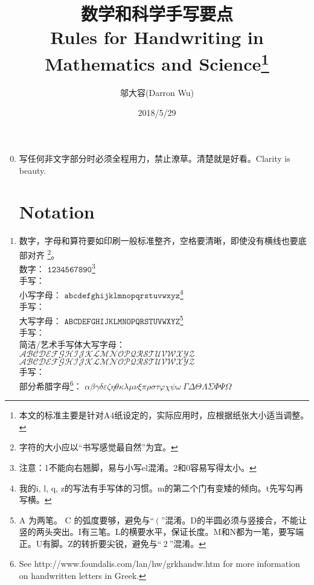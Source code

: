 \documentclass[11pt, a4paper, titlepage]{article}
\begin{document}
\title{数学和科学手写要点\\
\centering
{\Large Rules for Handwriting in Mathematics and Science\footnote{本文的标准主要是针对A4纸设定的，实际应用时，应根据纸张大小适当调整。}}}
\author{邬大容(Darron Wu)}
\date{2018/5/29}
\maketitle

\begin{enumerate}\setcounter{enumi}{-1}
\item 写任何非文字部分时必须全程用力，禁止潦草。清楚就是好看。Clarity is beauty.

\part{Notation}
\item 数字，字母和算符要如印刷一般标准整齐，空格要清晰，即使没有横线也要底部对齐    \footnote{字符的大小应以“书写感觉最自然”为宜。}。\\
    数字：
    {\fontsize{14pt}{1} $\mathtt{1234567890}$}\footnote{注意：1不能向右翘脚，易与小写el混淆。2和0容易写得太小。}\\
    手写：\\[7pt]
    小写字母：
    {\fontsize{14pt}{1} $\mathtt{abcdefghijklmnopqrstuvwxyz}$}\footnote{我的i, l, q, z的写法有手写体的习惯。m的第二个门有变矮的倾向。t先写勾再写横。}\\
    手写：\\[7pt]
    大写字母：
    {\fontsize{14pt}{1}
    $\mathtt{ABCDEFGHIJKLMNOPQRSTUVWXYZ}$}\footnote{A 为两笔。 C 的弧度要够，避免与``$\:(\:$''混淆。D的半圆必须与竖接合，不能让竖的两头突出。I有三笔。L的横要水平，保证长度。M和N都为一笔，要写端正。U有脚。Z的转折要尖锐，避免与``$\:2\:$''混淆。}\\
    手写：\\[7pt]
    简洁/艺术手写体大写字母：\\
    {\fontsize{14pt}{1}$\mathcal{ABCDEFGHIJKLMNOPQRSTUVWXYZ}$}\\
    {\fontsize{14pt}{1}$\mathscr{ABCDEFGHIJKLMNOPQRSTUVWXYZ}$}\\
    手写：\\[7pt]
    部分希腊字母\footnote{See http://www.foundalis.com/lan/hw/grkhandw.htm for more information on handwritten letters in Greek.}：
    {\fontsize{14pt}{1}
    $\alpha \beta \gamma \delta \varepsilon \zeta \eta \theta \kappa \lambda \mu \nu \xi \pi \rho \sigma \tau \varphi \chi \psi \omega \: \Gamma \Delta \Theta \Lambda \Sigma \Phi \Psi \Omega$}

\end{enumerate}
\end{document}
